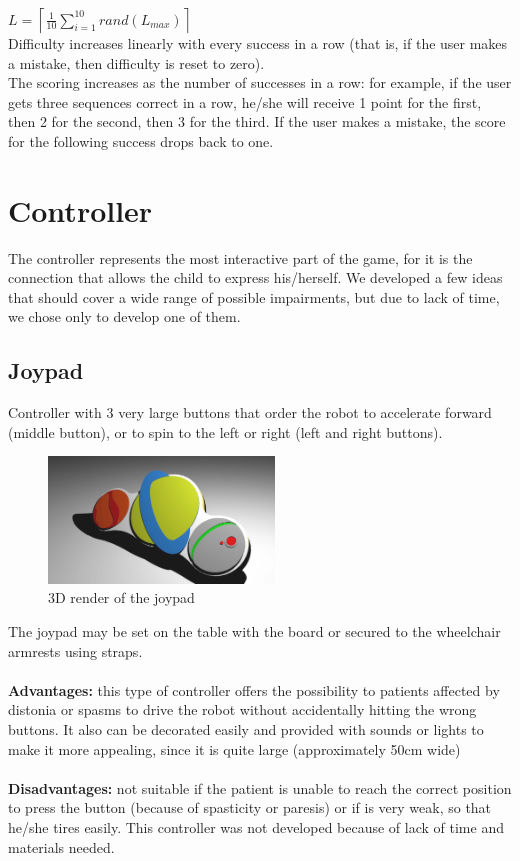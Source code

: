 \documentclass[a4paper,twoside]{book}
\begin{document}
$L = \left \lceil \frac{1}{10}\sum_{i=1}^{10} rand\left(L_{max}\right) \right \rceil$
\\
Difficulty increases linearly with every success in a row (that is, if the user makes a mistake, then difficulty is reset to zero).
\\
The scoring increases as the number of successes in a row: for example, if the user gets three sequences correct in a row, he/she will receive 1 point for the first, then 2 for the second, then 3 for the third. If the user makes a mistake, the score for the following success drops back to one.




\section{Controller}

The controller represents the most interactive part of the game, for it is the connection that allows the child to express his/herself.
We developed a few ideas that should cover a wide range of possible impairments, but due to lack of time, we chose only to develop one of them.

\subsection{Joypad}
Controller with 3 very large buttons that order the robot to accelerate forward (middle button), or to spin to the left or right (left and right buttons).

\begin{figure}
 \includegraphics[width=6cm]{img/controller.eps}
 \caption{3D render of the joypad}
\end{figure}

The joypad may be set on the table with the board or secured to the wheelchair armrests using straps.
\\
\\
\textbf{Advantages:} this type of controller offers the possibility to patients affected by distonia or spasms to drive the robot without accidentally hitting the wrong buttons. It also can be decorated easily and provided with sounds or lights to make it more appealing, since it is quite large (approximately 50cm wide)
\\
\\
\textbf{Disadvantages:} not suitable if the patient is unable to reach the correct position to press the button (because of spasticity or paresis) or if is very weak, so that he/she tires easily.
This controller was not developed because of lack of time and materials needed.
\end{document}
